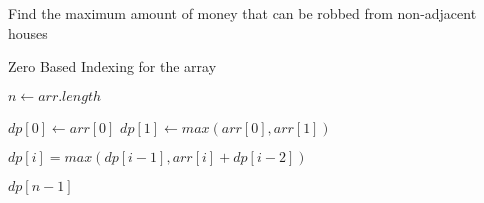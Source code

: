 \documentclass[12pt]{article}
\begin{document}
\begin{algorithm}

  \caption{Find the maximum amount of money that can be robbed from non-adjacent houses}
  
  \begin{algorithmic}[1]
    \Ensure Zero Based Indexing for the array
    \Statex
    
    
        
        \Statex
        \State $n \gets arr.length$
        
        \Statex
        
        \State $dp[0] \gets arr[0]$
        \State $dp[1] \gets max(arr[0],arr[1])$
        
        \Statex
        
            \State $dp[i] = max(dp[i-1], arr[i] + dp[i-2])$
        \EndFor
        
        \Statex
        
        \State \Return $dp[n-1]$
        
    \EndFunction
  \end{algorithmic}
  
\end{algorithm}
\end{document}
